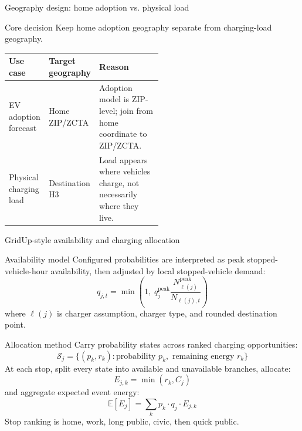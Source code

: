 \documentclass[aspectratio=169]{beamer}
\begin{document}
\begin{frame}{Geography design: home adoption vs. physical load}
\small
\begin{block}{Core decision}
Keep home adoption geography separate from charging-load geography.
\end{block}

\begin{tabularx}{\linewidth}{p{0.26\linewidth}p{0.26\linewidth}Y}
\toprule
\textbf{Use case} & \textbf{Target geography} & \textbf{Reason} \\
\midrule
EV adoption forecast & Home ZIP/ZCTA & Adoption model is ZIP-level; join from home coordinate to ZIP/ZCTA. \\
Physical charging load & Destination H3 & Load appears where vehicles charge, not necessarily where they live. \\
\bottomrule
\end{tabularx}
\end{frame}


\begin{frame}{GridUp-style availability and charging allocation}
\footnotesize
\setlength{\abovedisplayskip}{0.25em}
\setlength{\belowdisplayskip}{0.25em}
\begin{block}{Availability model}
Configured probabilities are interpreted as peak stopped-vehicle-hour availability, then adjusted by local stopped-vehicle demand:
\[
q_{j,t}=\min\left(1,\;q^{\text{peak}}_j
\frac{N^{\text{peak}}_{\ell(j)}}{N_{\ell(j),t}}\right)
\]
where $\ell(j)$ is charger assumption, charger type, and rounded destination point.
\end{block}

\begin{block}{Allocation method}
Carry probability states across ranked charging opportunities:
\[
\mathcal{S}_j = \{(p_k, r_k): \text{probability } p_k, \text{ remaining energy } r_k\}
\]
At each stop, split every state into available and unavailable branches, allocate:
\[
E_{j,k}=\min(r_k, C_j)
\]
and aggregate expected event energy:
\[
\mathbb{E}[E_j]=\sum_k p_k \cdot q_j \cdot E_{j,k}
\]
Stop ranking is home, work, long public, civic, then quick public.
\end{block}
\end{frame}
\end{document}
